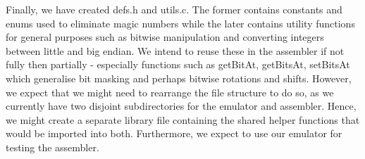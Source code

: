 \documentclass[11pt]{article}
\begin{document}
Finally, we have created defs.h and utils.c. The former contains constants and enums used to eliminate magic numbers while the later contains utility functions for general purposes such as bitwise manipulation and converting integers between little and big endian. We intend to reuse these in the assembler if not fully then partially - especially functions such as getBitAt, getBitsAt, setBitsAt which generalise bit masking and perhaps bitwise rotations and shifts. However, we expect that we might need to rearrange the file structure to do so, as we currently have two disjoint subdirectories for the emulator and assembler. Hence, we might create a separate library file containing the shared helper functions that would be imported into both. Furthermore, we expect to use our emulator for testing the assembler.
\end{document}
